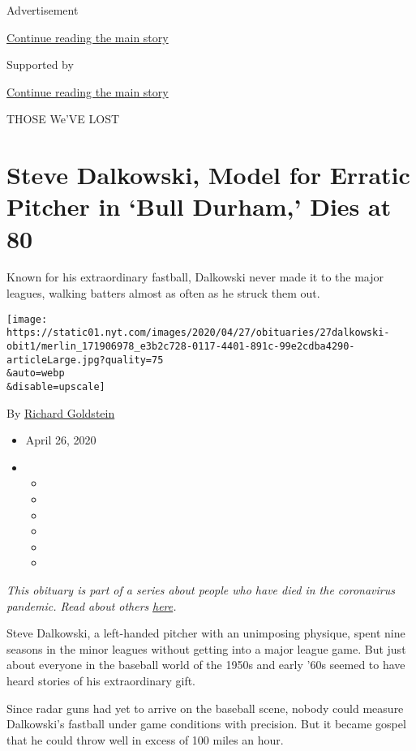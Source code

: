 Advertisement

\protect\hyperlink{after-top}{Continue reading the main story}

Supported by

\protect\hyperlink{after-sponsor}{Continue reading the main story}

THOSE We'VE LOST

\hypertarget{steve-dalkowski-model-for-erratic-pitcher-in-bull-durham-dies-at-80}{%
\section{Steve Dalkowski, Model for Erratic Pitcher in `Bull Durham,'
Dies at
80}\label{steve-dalkowski-model-for-erratic-pitcher-in-bull-durham-dies-at-80}}

Known for his extraordinary fastball, Dalkowski never made it to the
major leagues, walking batters almost as often as he struck them out.

\texttt{[image: https://static01.nyt.com/images/2020/04/27/obituaries/27dalkowski-obit1/merlin\_171906978\_e3b2c728-0117-4401-891c-99e2cdba4290-articleLarge.jpg?quality=75\\\&auto=webp\\\&disable=upscale]}

By \href{https://www.nytimes.com/by/richard-goldstein}{Richard
Goldstein}

\begin{itemize}
\item
  April 26, 2020
\item
  \begin{itemize}
  \item
  \item
  \item
  \item
  \item
  \item
  \end{itemize}
\end{itemize}

\emph{This obituary is part of a series about people who have died in
the coronavirus pandemic. Read about others}
\href{https://www.nytimes.com/series/people-who-have-died-of-the-coronavirus}{\emph{here}}\emph{.}

Steve Dalkowski, a left-handed pitcher with an unimposing physique,
spent nine seasons in the minor leagues without getting into a major
league game. But just about everyone in the baseball world of the 1950s
and early '60s seemed to have heard stories of his extraordinary gift.

Since radar guns had yet to arrive on the baseball scene, nobody could
measure Dalkowski's fastball under game conditions with precision. But
it became gospel that he could throw well in excess of 100 miles an
hour.

